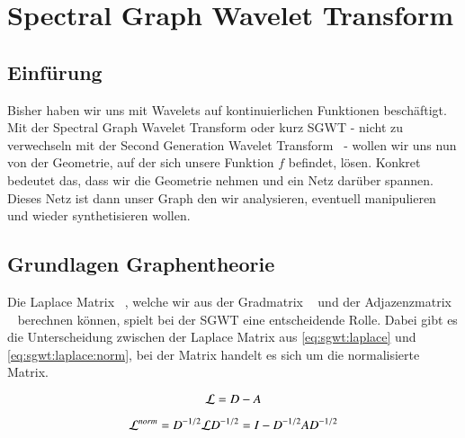 %
%
%
\chapter{Spectral Graph Wavelet Transform\label{chapter:sgwt}}
\begin{refsection}



\section{Einf\"urung}

Bisher haben wir uns mit Wavelets auf kontinuierlichen Funktionen 
besch\"aftigt. Mit der Spectral Graph Wavelet Transform oder kurz SGWT - 
nicht zu verwechseln mit der Second Generation Wavelet 
Transform~\cite{noauthor_second-generation_2018} - wollen wir uns nun 
von der Geometrie, auf der sich unsere Funktion $f$ befindet, l\"osen. Konkret 
bedeutet das, dass wir die Geometrie nehmen und ein Netz dar\"uber spannen. 
Dieses Netz ist dann unser Graph den wir analysieren, eventuell manipulieren 
und wieder synthetisieren wollen.

\section{Grundlagen Graphentheorie\label{sec:sgwt:graphs}}

Die Laplace Matrix 
\laplaceL~\cite{noauthor_laplace-matrix_2017}, welche wir aus der 
Gradmatrix \degreeM~\cite{noauthor_degree_2018} und der Adjazenzmatrix 
\adjacencyM~\cite{noauthor_adjacency_2019} berechnen k\"onnen, spielt bei der 
SGWT eine entscheidende Rolle. Dabei gibt es 
die Unterscheidung zwischen der Laplace Matrix aus \cref{eq:sgwt:laplace} und 
\cref{eq:sgwt:laplace:norm}, bei der \laplaceLnorm{} Matrix handelt es sich um 
die normalisierte \laplaceL{} Matrix.


\begin{equation}
\laplaceL = \degreeM - \adjacencyM
\label{eq:sgwt:laplace}
\end{equation}

\begin{equation}
\laplaceLnorm
= \degreeM^{-1/2}\laplaceL\degreeM^{-1/2}
= I - \degreeM^{-1/2}\adjacencyM\degreeM^{-1/2}
\label{eq:sgwt:laplace:norm}
\end{equation}




\end{refsection}
